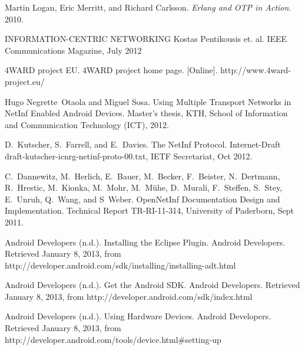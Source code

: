 \documentclass[11pt]{report}
\begin{document}
\begin{thebibliography}{99}

 Martin Logan, Eric Merritt, and Richard Carlsson. \textsl{Erlang and OTP in Action}. 2010.

 INFORMATION-CENTRIC NETWORKING Kostas Pentikousis et. al. IEEE Communications Magazine, July 2012

 4WARD project EU. 4WARD project home page. [Online]. http://www.4ward-project.eu/

Hugo Negrette~Otaola and Miguel Sosa.
\newblock Using Multiple Transport Networks in NetInf Enabled Android Devices.
\newblock Master's thesis, KTH, School of Information and Communication
  Technology (ICT), 2012.

D.~Kutscher, S.~Farrell, and E.~Davies.
\newblock The NetInf Protocol.
\newblock Internet-Draft draft-kutscher-icnrg-netinf-proto-00.txt, IETF
  Secretariat, Oct 2012.

C.~Dannewitz, M.~Herlich, E.~Bauer, M.~Becker, F.~Beister, N.~Dertmann,
  R.~Hrestic, M.~Kionka, M.~Mohr, M.~M\"uhe, D.~Murali, F.~Steffen, S.~Stey,
  E.~Unruh, Q.~Wang, and S~Weber.
\newblock OpenNetInf Documentation Design and Implementation.
\newblock Technical Report TR-RI-11-314, University of Paderborn, Sept 2011.

 Android Developers (n.d.). Installing the Eclipse Plugin. Android Developers. Retrieved January 8, 2013, from http://developer.android.com/sdk/installing/installing-adt.html

 Android Developers (n.d.). Get the Android SDK. Android Developers. Retrieved January 8, 2013, from http://developer.android.com/sdk/index.html

 Android Developers (n.d.). Using Hardware Devices. Android Developers. Retrieved January 8, 2013, from http://developer.android.com/tools/device.html\#setting-up


\end{thebibliography}
\end{document}
